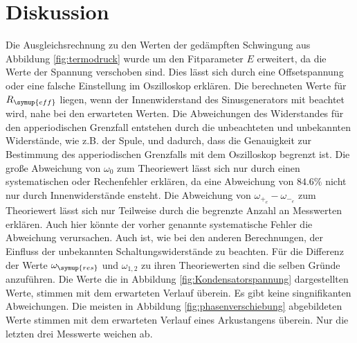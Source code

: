 \section{Diskussion}
\label{sec:Diskussion}
Die Ausgleichsrechnung zu den Werten der gedämpften Schwingung aus Abbildung
\ref{fig:termodruck} wurde um den Fitparameter $E$ erweitert, da die Werte
der Spannung verschoben sind. Dies lässt sich durch eine Offsetspannung oder
eine falsche Einstellung im Oszilloskop erklären.
Die berechneten Werte für $R_{\symup{eff}}$ liegen, wenn der Innenwiderstand des
Sinusgenerators mit beachtet wird, nahe bei den erwarteten Werten. Die
Abweichungen des Widerstandes für den apperiodischen Grenzfall entstehen
 durch die unbeachteten und unbekannten Widerstände, wie z.B.
der Spule, und dadurch, dass die Genauigkeit zur Bestimmung des apperiodischen
Grenzfalls mit dem Oszilloskop begrenzt ist.
Die große Abweichung von $\omega_0$
zum Theoriewert lässt sich nur durch einen systematischen oder Rechenfehler erklären,
da eine Abweichung von $84.6\%$ nicht nur durch Innenwiderstände ensteht.
Die Abweichung von
$\omega_{+_e}-\omega_{-_e}$ zum Theoriewert lässt sich nur Teilweise durch die
begrenzte Anzahl an Messwerten erklären.
 Auch hier könnte der vorher genannte systematische Fehler die Abweichung verursachen.
Auch ist, wie bei den anderen Berechnungen, der Einfluss der unbekannten
Schaltungswiderstände zu beachten.
Für die Differenz der Werte $\omega_{\symup{res}}$ und $\omega_{1,2} $ zu ihren Theoriewerten
sind die selben Gründe anzuführen.
Die Werte die in Abbildung \ref{fig:Kondensatorspannung} dargestellten Werte,
stimmen mit dem erwarteten Verlauf überein. Es gibt keine singnifikanten
Abweichungen.
Die meisten in Abbildung \ref{fig:phasenverschiebung} abgebildeten Werte stimmen mit dem
erwarteten Verlauf eines Arkustangens überein. Nur die letzten drei Messwerte
weichen ab.
